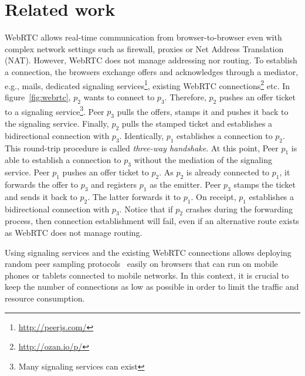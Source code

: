 
\begin{figure*}
\centering
{}
\hspace{20pt}
\hspace{20pt}
\caption{\label{fig:webrtc}Creating an overlay network on top of WebRTC.}
\end{figure*}


\section{Related work}
\label{sec:relatedwork}


WebRTC allows real-time communication from browser-to-browser even with complex
network settings such as firewall, proxies or Net Address Translation
(NAT). However, WebRTC does not manage addressing nor routing. To establish a
connection, the browsers exchange offers and acknowledges through a mediator,
e.g., mails, dedicated signaling services\footnote{\url{http://peerjs.com/}},
existing WebRTC connections\footnote{\url{http://ozan.io/p/}} etc. In
figure~\ref{fig:webrtc}, $p_2$ wants to connect to $p_3$. Therefore, $p_2$
pushes an offer ticket to a signaling service\footnote{Many signaling services
  can exist}. Peer $p_3$ pulls the offers, stamps it and pushes it back to the
signaling service. Finally, $p_2$ pulls the stamped ticket and establishes a
bidirectional connection with $p_3$.  Identically, $p_1$ establishes a
connection to $p_2$. This round-trip procedure is called \emph{three-way
  handshake}. At this point, Peer $p_1$ is able to establish a connection to
$p_3$ without the mediation of the signaling service. Peer $p_1$ pushes an
offer ticket to $p_2$.  As $p_2$ is already connected to $p_1$, it forwards the
offer to $p_3$ and registers $p_1$ as the emitter. Peer $p_3$ stamps the ticket
and sends it back to $p_2$. The latter forwards it to $p_1$. On receipt, $p_1$
establishes a bidirectional connection with $p_3$. Notice that if $p_2$
crashes during the forwarding process, then connection establishment will fail,
even if an alternative route exists as WebRTC does not manage routing.

Using signaling services and the existing WebRTC connections allows deploying
random peer sampling protocols~\cite{jelasity2004peer} easily on browsers that
can run on mobile phones or tablets connected to mobile networks. In this
context, it is crucial to keep the number of connections as low as possible in
order to limit the traffic and resource consumption.

